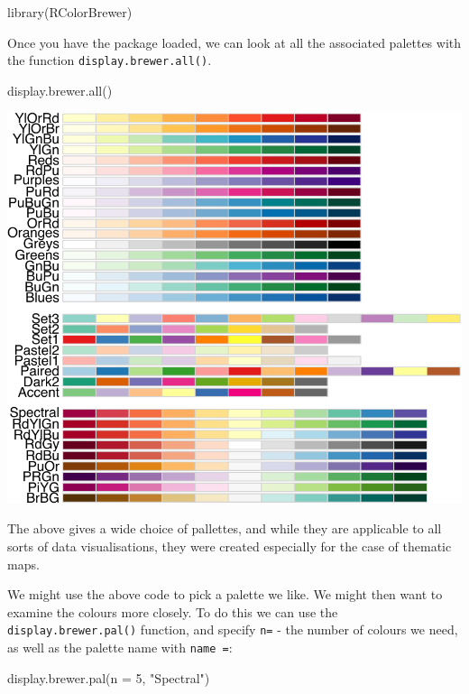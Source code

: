 \documentclass[
]{book}
\newenvironment{Shaded}{\begin{snugshade}}{\end{snugshade}}
\newcommand{\AttributeTok}[1]{\textcolor[rgb]{0.77,0.63,0.00}{#1}}
\newcommand{\DecValTok}[1]{\textcolor[rgb]{0.00,0.00,0.81}{#1}}
\newcommand{\FunctionTok}[1]{\textcolor[rgb]{0.00,0.00,0.00}{#1}}
\newcommand{\NormalTok}[1]{#1}
\newcommand{\StringTok}[1]{\textcolor[rgb]{0.31,0.60,0.02}{#1}}
\begin{document}
\begin{Shaded}
\begin{Highlighting}[]
\FunctionTok{library}\NormalTok{(RColorBrewer)}
\end{Highlighting}
\end{Shaded}

Once you have the package loaded, we can look at all the associated palettes with the function \texttt{display.brewer.all()}.

\begin{Shaded}
\begin{Highlighting}[]
\FunctionTok{display.brewer.all}\NormalTok{()}
\end{Highlighting}
\end{Shaded}

\includegraphics{crime_mapping_files/figure-latex/dsplayallcolourbrewerpallettes-1.pdf}

The above gives a wide choice of pallettes, and while they are applicable to all sorts of data visualisations, they were created especially for the case of thematic maps.

We might use the above code to pick a palette we like. We might then want to examine the colours more closely. To do this we can use the \texttt{display.brewer.pal()} function, and specify \texttt{n=} - the number of colours we need, as well as the palette name with \texttt{name\ =}:

\begin{Shaded}
\begin{Highlighting}[]
\FunctionTok{display.brewer.pal}\NormalTok{(}\AttributeTok{n =} \DecValTok{5}\NormalTok{, }\StringTok{"Spectral"}\NormalTok{)}
\end{Highlighting}
\end{Shaded}
\end{document}
